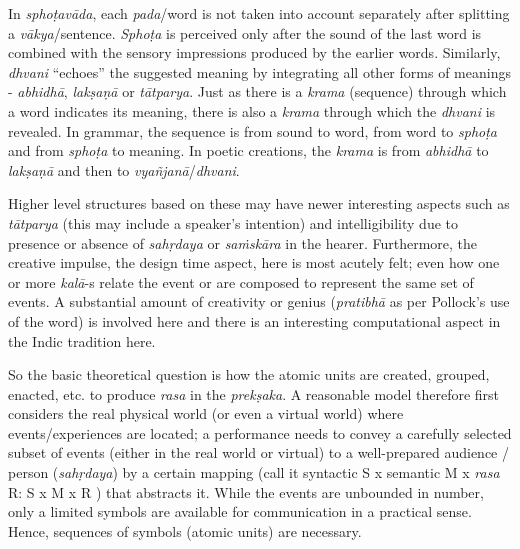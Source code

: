 In \textsl{sphoṭavāda}, each \textsl{pada}/word is not taken into account separately after splitting a \textsl{vākya}/sentence. \textsl{Sphoṭa} is perceived only after the sound of the last word is combined with the sensory impressions produced by the earlier words. Similarly, \textsl{dhvani} “echoes” the suggested meaning by integrating all other forms of meanings - \textsl{abhidhā}, \textsl{lakṣaṇā} or \textsl{tātparya}. Just as there is a \textsl{krama} (sequence) through which a word indicates its meaning, there is also a \textsl{krama} through which the \textsl{dhvani} is revealed. In grammar, the sequence is from sound to word, from word to \textsl{sphoṭa} and from \textsl{sphoṭa} to meaning. In poetic creations, the \textsl{krama} is from \textsl{abhidhā} to \textsl{lakṣaṇā} and then to \textsl{vyañjanā}/\textsl{dhvani}.


Higher level structures based on these may have newer interesting aspects such as \textsl{tātparya} (this may include a speaker’s intention) and intelligibility due to presence or absence of \textsl{sahṛdaya} or \textsl{saṁskāra} in the hearer. Furthermore, the creative impulse, the design time aspect, here is most acutely felt; even how one or more \textsl{kalā}-s relate the event or are composed to represent the same set of events. A substantial amount of creativity or genius (\textsl{pratibhā} as per Pollock’s use of the word) is involved here and there is an interesting computational aspect in the Indic tradition here.

So the basic theoretical question is how the atomic units are created, grouped, enacted, etc. to produce \textsl{rasa} in the \textsl{prekṣaka}. A reasonable model therefore first considers the real physical world (or even a virtual world) where events/experiences are located; a performance needs to convey a carefully selected subset of events (either in the real world or virtual) to a well-prepared audience / person (\textsl{sahṛdaya}) by a certain mapping (call it syntactic S x semantic M x \textsl{rasa} R: S x M x R ) that abstracts it. While the events are unbounded in number, only a limited symbols are available for communication in a practical sense. Hence, sequences of symbols (atomic units) are necessary.


